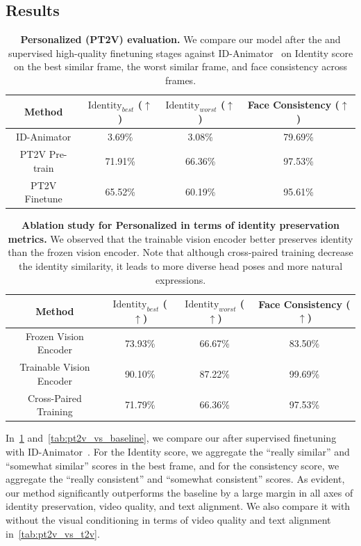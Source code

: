 \subsection{Results}
\label{sec:pt2v_results}


\begin{table}[!t]
    \centering
        \begin{tabular}{c ccc}
        \toprule
			Method & $\text{Identity}_{best}$ ($\uparrow$) & $\text{Identity}_{worst}$ ($\uparrow$) & Face Consistency ($\uparrow$) \\
			\midrule
			ID-Animator & 3.69\% & 3.08\% & 79.69\% \\
			PT2V Pre-train & 71.91\% & 66.36\% & 97.53\% \\
			PT2V Finetune & 65.52\% & 60.19\% & 95.61\% \\
		\bottomrule
		\end{tabular}
    \caption{\textbf{Personalized \OursVideo (PT2V) evaluation.} We compare our model after the \pretraining and supervised high-quality finetuning stages against ID-Animator~\citep{he2024id} on Identity score on the best similar frame, the worst similar frame, and face consistency across frames.
    }
    \label{tab:pt2v_main_identity}
\end{table}


\begin{table}[!t]
    \centering
        \begin{tabular}{c ccc}
        \toprule
			Method & $\text{Identity}_{best}$ ($\uparrow$) & $\text{Identity}_{worst}$ ($\uparrow$) & Face Consistency ($\uparrow$) \\
			\midrule
			Frozen Vision Encoder & 73.93\% & 66.67\% & 83.50\% \\
			Trainable Vision Encoder & 90.10\% & 87.22\% & 99.69\% \\
			Cross-Paired Training & 71.79\% & 66.36\% & 97.53\% \\
		\bottomrule
		\end{tabular}
    \caption{\textbf{Ablation study for Personalized \OursVideo in terms of identity preservation metrics.} We observed that the trainable vision encoder better preserves identity than the frozen vision encoder. Note that although cross-paired training decrease the identity similarity, it leads to more diverse head poses and more natural expressions.}
    \label{tab:pt2v_ablation_face}
\end{table}



In~\cref{tab:pt2v_main_identity} and~\cref{tab:pt2v_vs_baseline}, we compare our \OursPTV after supervised finetuning with ID-Animator~\citep{he2024id}. For the Identity score, we aggregate the ``really similar'' and ``somewhat similar'' scores in the best frame, and for the consistency score, we aggregate the ``really consistent'' and ``somewhat consistent'' scores. As evident, our method significantly outperforms the baseline by a large margin in all axes of identity preservation, video quality, and text alignment.
We also compare it with \OursVideo without the visual conditioning in terms of video quality and text alignment in~\cref{tab:pt2v_vs_t2v}.

